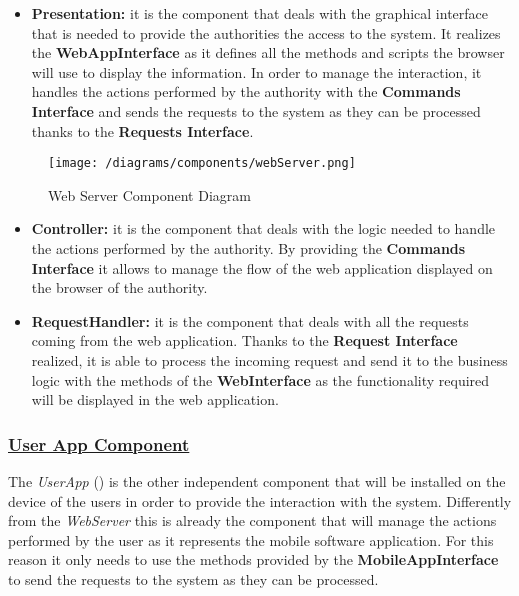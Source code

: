 			\begin{itemize}
				\item \textbf{Presentation:} it is the component that deals with the graphical interface that is needed to provide the authorities the access to the system. It realizes the \textbf{WebAppInterface} as it defines all the methods and scripts the browser will use to display the information. In order to manage the interaction, it handles the actions performed by the authority with the \textbf{Commands Interface} and sends the requests to the system as they can be processed thanks to the \textbf{Requests Interface}.
			\end{itemize}
			
				\begin{figure}[ht]
					\centering
					\texttt{[image: /diagrams/components/webServer.png]}
					\caption{\label{fig:webServerComp} Web Server Component Diagram}
				\end{figure}
		
			\begin{itemize}
				\item \textbf{Controller:} it is the component that deals with the logic needed to handle the actions performed by the authority. By providing the \textbf{Commands Interface} it allows to manage the flow of the web application displayed on the browser of the authority.
				
				\item \textbf{RequestHandler:} it is the component that deals with all the requests coming from the web application. Thanks to the \textbf{Request Interface} realized, it is able to process the incoming request and send it to the business logic with the methods of the \textbf{WebInterface} as the functionality required will be displayed in the web application.
			\end{itemize}
		
		\subsubsection[User App Component]{\hyperlink{toc}{User App Component}}
			\label{sec:userAppComponent}
			
			The \emph{UserApp} () is the other independent component that will be installed on the device of the users in order to provide the interaction with the system. Differently from the \emph{WebServer} this is already the component that will manage the actions performed by the user as it represents the mobile software application. For this reason it only needs to use the methods provided by the \textbf{MobileAppInterface} to send the requests to the system as they can be processed.\\
			
